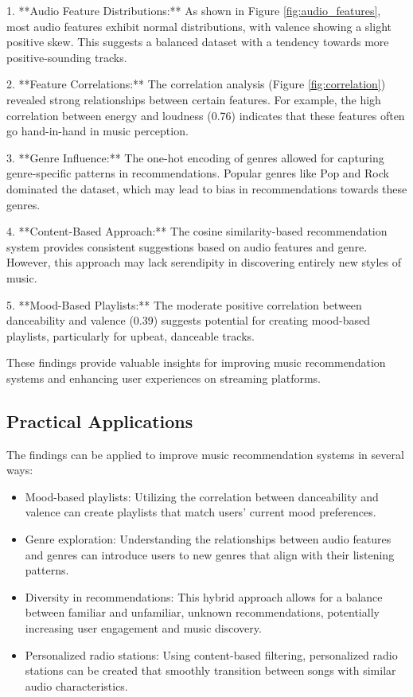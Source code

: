 \documentclass[runningheads]{llncs}
\begin{document}
1. **Audio Feature Distributions:** As shown in Figure \ref{fig:audio_features}, most audio features exhibit normal distributions, with valence showing a slight positive skew. This suggests a balanced dataset with a tendency towards more positive-sounding tracks.
    
2. **Feature Correlations:** The correlation analysis (Figure \ref{fig:correlation}) revealed strong relationships between certain features. For example, the high correlation between energy and loudness (0.76) indicates that these features often go hand-in-hand in music perception.
    
3. **Genre Influence:** The one-hot encoding of genres allowed for capturing genre-specific patterns in recommendations. Popular genres like Pop and Rock dominated the dataset, which may lead to bias in recommendations towards these genres.
    
4. **Content-Based Approach:** The cosine similarity-based recommendation system provides consistent suggestions based on audio features and genre. However, this approach may lack serendipity in discovering entirely new styles of music.
 
5. **Mood-Based Playlists:** The moderate positive correlation between danceability and valence (0.39) suggests potential for creating mood-based playlists, particularly for upbeat, danceable tracks.

These findings provide valuable insights for improving music recommendation systems and enhancing user experiences on streaming platforms.

\subsection{Practical Applications}
The findings can be applied to improve music recommendation systems in several ways:
\begin{itemize}
    \item Mood-based playlists: Utilizing the correlation between danceability and valence can create playlists that match users' current mood preferences.
    \item Genre exploration: Understanding the relationships between audio features and genres can introduce users to new genres that align with their listening patterns.
    \item Diversity in recommendations: This hybrid approach allows for a balance between familiar and unfamiliar, unknown recommendations, potentially increasing user engagement and music discovery.
    \item Personalized radio stations: Using content-based filtering, personalized radio stations can be created that smoothly transition between songs with similar audio characteristics.
\end{itemize}
\end{document}
